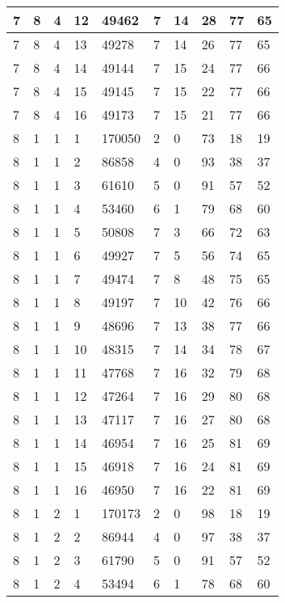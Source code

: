 \begin{table}[!ht]
\begin{tabular}{|l|l|l|l|l|l|l|l|l|l|}
        7 & 8 & 4 & 12 & 49462 & 7 & 14 & 28 & 77 & 65 \\ \hline
        7 & 8 & 4 & 13 & 49278 & 7 & 14 & 26 & 77 & 65 \\ \hline
        7 & 8 & 4 & 14 & 49144 & 7 & 15 & 24 & 77 & 66 \\ \hline
        7 & 8 & 4 & 15 & 49145 & 7 & 15 & 22 & 77 & 66 \\ \hline
        7 & 8 & 4 & 16 & 49173 & 7 & 15 & 21 & 77 & 66 \\ \hline
        8 & 1 & 1 & 1 & 170050 & 2 & 0 & 73 & 18 & 19 \\ \hline
        8 & 1 & 1 & 2 & 86858 & 4 & 0 & 93 & 38 & 37 \\ \hline
        8 & 1 & 1 & 3 & 61610 & 5 & 0 & 91 & 57 & 52 \\ \hline
        8 & 1 & 1 & 4 & 53460 & 6 & 1 & 79 & 68 & 60 \\ \hline
        8 & 1 & 1 & 5 & 50808 & 7 & 3 & 66 & 72 & 63 \\ \hline
        8 & 1 & 1 & 6 & 49927 & 7 & 5 & 56 & 74 & 65 \\ \hline
        8 & 1 & 1 & 7 & 49474 & 7 & 8 & 48 & 75 & 65 \\ \hline
        8 & 1 & 1 & 8 & 49197 & 7 & 10 & 42 & 76 & 66 \\ \hline
        8 & 1 & 1 & 9 & 48696 & 7 & 13 & 38 & 77 & 66 \\ \hline
        8 & 1 & 1 & 10 & 48315 & 7 & 14 & 34 & 78 & 67 \\ \hline
        8 & 1 & 1 & 11 & 47768 & 7 & 16 & 32 & 79 & 68 \\ \hline
        8 & 1 & 1 & 12 & 47264 & 7 & 16 & 29 & 80 & 68 \\ \hline
        8 & 1 & 1 & 13 & 47117 & 7 & 16 & 27 & 80 & 68 \\ \hline
        8 & 1 & 1 & 14 & 46954 & 7 & 16 & 25 & 81 & 69 \\ \hline
        8 & 1 & 1 & 15 & 46918 & 7 & 16 & 24 & 81 & 69 \\ \hline
        8 & 1 & 1 & 16 & 46950 & 7 & 16 & 22 & 81 & 69 \\ \hline
        8 & 1 & 2 & 1 & 170173 & 2 & 0 & 98 & 18 & 19 \\ \hline
        8 & 1 & 2 & 2 & 86944 & 4 & 0 & 97 & 38 & 37 \\ \hline
        8 & 1 & 2 & 3 & 61790 & 5 & 0 & 91 & 57 & 52 \\ \hline
        8 & 1 & 2 & 4 & 53494 & 6 & 1 & 78 & 68 & 60 \\ \hline

\end{tabular}
\end{table}

